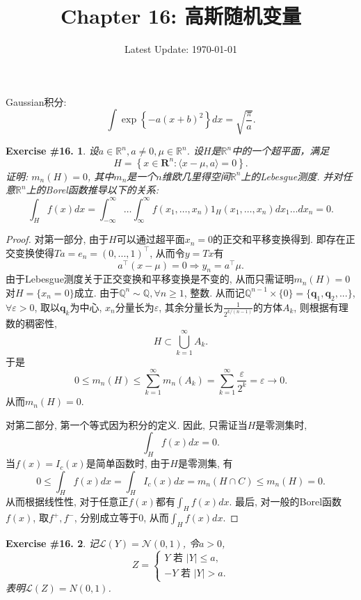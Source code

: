 \documentclass[UTF8, a4paper]{article}
\title{Chapter 16: 高斯随机变量}
\author{}
\date{Latest Update: \today}
\newtheorem{exercise}{Exercise \#16.}
\begin{document}
\maketitle

Gaussian积分:
$$
\int \exp\left\{-a(x+b)^2\right\} dx = \sqrt{\frac{\pi}{a}}.
$$


\begin{framed}
\begin{exercise}
设\(a \in \mathbb{R}^n, a \neq 0, \mu \in \mathbb{R}^n\).
设\(H\)是\(\mathbb{R}^n\)中的一个超平面，满足
$$
H=\left\{x \in \mathbf{R}^n:\langle x-\mu, a\rangle=0\right\} .
$$
证明: \(m_n(H) = 0\), 其中\(m_n\)是一个\(n\)维欧几里得空间\(\mathbb{R}^n\)上的Lebesgue测度.
并对任意\(\mathbb{R}^n\)上的Borel函数推导以下的关系:
$$
\int_H f(x) d x=\int_{-\infty}^{\infty} \ldots \int_{\infty}^{\infty} f\left(x_1, \ldots, x_n\right) 1_H\left(x_1, \ldots, x_n\right) d x_1 \ldots d x_n=0.
$$
\end{exercise}
\end{framed}

\begin{proof}
对第一部分, 由于\(H\)可以通过超平面\(x_n = 0\)的正交和平移变换得到.
即存在正交变换使得\(Ta = e_n = (0, ..., 1)^\top\), 从而令\(y = Tx\)有
$$
a^\top (x - \mu) = 0  \Rightarrow y_n = a^\top \mu.
$$
由于Lebesgue测度关于正交变换和平移变换是不变的, 从而只需证明\(m_n(H) = 0\)对\(H = \{x_n = 0\}\)成立.
由于\(\mathbb{Q}^{n} \sim \mathbb{Q}, \forall n \geq 1\), 整数. 
从而记\(\mathbb{Q}^{n-1}\times \{0\} = \{\mathbf{q}_1, \mathbf{q}_2, ...\}\), 
\(\forall \varepsilon >0\), 取以\(\mathbf{q}_k\)为中心, \(x_n\)分量长为\(\varepsilon\), 其余分量长为\(\frac{1}{2^{k/(n-1)}}\)的方体\(A_k\), 则根据有理数的稠密性, 
$$
H \subset \bigcup_{k=1}^{\infty} A_k.
$$
于是
$$
0 \leq m_n(H) \leq \sum_{k=1}^{\infty} m_n(A_k) = \sum_{k=1}^{\infty} \frac{\varepsilon}{2^{k}} = \varepsilon \to 0.
$$
从而\(m_n(H) = 0\).


对第二部分, 第一个等式因为积分的定义. 因此, 只需证当\(H\)是零测集时, 
$$
\int_H f(x) d x= 0.
$$
当\(f(x) = I_c(x)\)是简单函数时, 由于\(H\)是零测集, 有
$$
0 \leq \int_H f(x) d x=  \int_H I_c(x) d x = m_n(H \cap C) \leq m_n(H) = 0.
$$
从而根据线性性, 对于任意正\(f(x)\)都有\(\int_H f(x) d x\).
最后, 对一般的Borel函数\(f(x)\), 取\(f^+, f^-\), 分别成立等于0, 从而\(\int_H f(x) d x\).
\end{proof}


\begin{framed}
\begin{exercise}
记\(\mathcal{L}(Y) = \mathcal{N}(0, 1)\), 令\(a > 0\), 
$$
Z=\left\{\begin{array}{c}
Y \text { 若 }|Y| \leq a, \\
-Y \text { 若 }|Y|>a .
\end{array}\right.
$$
表明\(\mathcal{L}(Z) = N(0, 1)\).
\end{exercise}
\end{framed}
\end{document}
